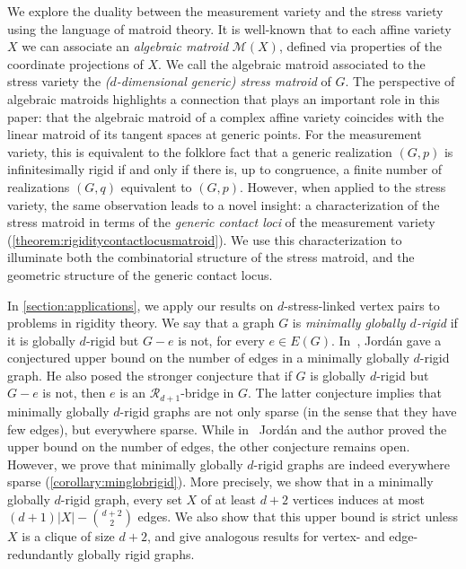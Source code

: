 \documentclass[11pt,a4paper,dvipsnames]{scrartcl}
\theoremstyle{definition}
\newcommand{\globrig}[1]{globally $#1$-rigid}
\newcommand{\strongly}[1]{${#1}$-stress-linked}
\begin{document}
We explore the duality between the measurement variety and the stress variety using the language of matroid theory. It is well-known that to each affine variety $X$ we can associate an \emph{algebraic matroid} $\mathcal{M}(X)$, defined via properties of the coordinate projections of $X$. We call the algebraic matroid associated to the stress variety the \emph{($d$-dimensional generic) stress matroid} of $G$.
The perspective of algebraic matroids highlights a connection that plays an important role in this paper: that the algebraic matroid of a complex affine variety coincides with the linear matroid of its tangent spaces at generic points. For the measurement variety, this is equivalent to the folklore fact that a generic realization $(G,p)$ is infinitesimally rigid if and only if there is, up to congruence, a finite number of realizations $(G,q)$ equivalent to $(G,p)$. However, when applied to the stress variety, the same observation leads to a novel insight: a characterization of the stress matroid in terms of the \emph{generic contact loci} of the measurement variety (\cref{theorem:rigiditycontactlocusmatroid}). We use this characterization to illuminate both the combinatorial structure of the stress matroid, and the geometric structure of the generic contact locus.


In \cref{section:applications}, we apply our results on \strongly{d} vertex pairs to problems in rigidity theory. We say that a graph $G$ is \emph{minimally \globrig{d}} if it is \globrig{d} but $G-e$ is not, for every $e \in E(G)$. In~\cite{jordan_2017}, Jordán gave a conjectured upper bound on the number of edges in a minimally \globrig{d} graph. He also posed the stronger conjecture that if $G$ is \globrig{d} but $G-e$ is not, then $e$ is an $\mathcal{R}_{d+1}$-bridge in $G$. The latter conjecture implies that minimally \globrig{d} graphs are not only sparse (in the sense that they have few edges), but everywhere sparse. While in~\cite{garamvolgyi.jordan_2023} Jordán and the author proved the upper bound on the number of edges, the other conjecture remains open. However, we prove that minimally \globrig{d} graphs are indeed everywhere sparse (\cref{corollary:minglobrigid}). More precisely, we show that in a minimally \globrig{d} graph, every set $X$ of at least $d+2$ vertices induces at most $(d+1)|X| - \binom{d+2}{2}$ edges. We also show that this upper bound is strict unless $X$ is a clique of size $d+2$, and give analogous results for vertex- and edge-redundantly globally rigid graphs.
\end{document}
